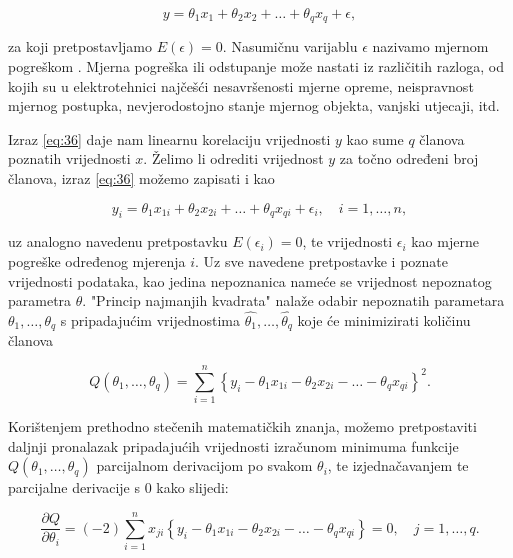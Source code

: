 \documentclass[a4paper,12pt,oneside]{memoir}
\begin{document}
                \begin{equation}
                    y=\theta_1x_1+\theta_2x_2+\ldots+\theta_qx_q+\epsilon,
                    \label{eq:37}
                \end{equation}

                za koji pretpostavljamo $E(\epsilon)=0$. Nasumičnu varijablu $\epsilon$ nazivamo mjernom pogreškom \cite{Priestley}. Mjerna pogreška ili odstupanje može nastati iz različitih razloga, od kojih su u elektrotehnici najčešći nesavršenosti mjerne opreme, neispravnost mjernog postupka, nevjerodostojno stanje mjernog objekta, vanjski utjecaji, itd.

                Izraz \ref{eq:36} daje nam linearnu korelaciju vrijednosti $y$ kao sume $q$ članova poznatih vrijednosti $x$. Želimo li odrediti vrijednost $y$ za točno određeni broj članova, izraz \ref{eq:36} možemo zapisati i kao
                
                \begin{equation}
                    y_i=\theta_1x_{1i}+\theta_2x_{2i}+\ldots+\theta_qx_{qi}+\epsilon_i, \quad i=1,\ldots,n,
                    \label{eq:38}
                \end{equation}
                
                uz analogno navedenu pretpostavku $E(\epsilon_i)=0$, te vrijednosti $\epsilon_i$ kao mjerne pogreške određenog mjerenja $i$. Uz sve navedene pretpostavke i poznate vrijednosti podataka, kao jedina nepoznanica nameće se vrijednost nepoznatog parametra $\theta$. "Princip najmanjih kvadrata" nalaže odabir nepoznatih parametara $\theta_1,\ldots,\theta_q$ s pripadajućim vrijednostima $\widehat{\theta_1},\ldots,\widehat{\theta_q}$ koje će minimizirati količinu članova \cite{Priestley}

                \begin{equation}
                    Q(\theta_1,\ldots,\theta_q)=\displaystyle\sum_{i=1}^{n}\left\{y_i-\theta_1x_{1i}-\theta_2x_{2i}-\ldots-\theta_qx_{qi}\right\}^2.
                    \label{eq:39}
                \end{equation}

                Korištenjem prethodno stečenih matematičkih znanja, možemo pretpostaviti daljnji pronalazak pripadajućih vrijednosti izračunom minimuma funkcije $Q(\theta_1,\ldots,\theta_q)$ parcijalnom derivacijom po svakom $\theta_i$, te izjednačavanjem te parcijalne derivacije s 0 kako slijedi:

                \begin{equation}
                    \frac{\partial Q}{\partial \theta_i}=(-2)\displaystyle\sum_{i=1}^{n}x_{ji}\left\{y_i-\theta_1x_{1i}-\theta_2x_{2i}-\ldots-\theta_qx_{qi}\right\}=0, \quad j=1,\ldots,q.
                    \label{eq:310}
                \end{equation}
\end{document}
